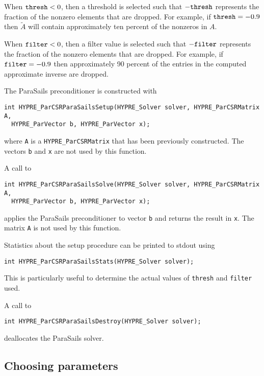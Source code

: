 When ${\tt thresh} < 0$, then a threshold is selected such that 
$-{\tt thresh}$ represents the fraction of the nonzero elements
that are dropped.  For example, if ${\tt thresh} = -0.9$ then
$\tilde{A}$ will contain approximately ten percent of the nonzeros
in $A$.

When ${\tt filter} < 0$, then a filter value is selected such that 
$-{\tt filter}$ represents the fraction of the nonzero elements
that are dropped.  For example, if ${\tt filter} = -0.9$ then
approximately 90 percent of the entries in the computed approximate 
inverse are dropped.

The ParaSails preconditioner is constructed with
\begin{display}
\begin{verbatim}
int HYPRE_ParCSRParaSailsSetup(HYPRE_Solver solver, HYPRE_ParCSRMatrix A,
  HYPRE_ParVector b, HYPRE_ParVector x);
\end{verbatim}
\end{display}
where {\tt A} is a {\tt HYPRE\_ParCSRMatrix} that has been 
previously constructed.  The vectors {\tt b} and {\tt x} are
not used by this function.

A call to
\begin{display}
\begin{verbatim}
int HYPRE_ParCSRParaSailsSolve(HYPRE_Solver solver, HYPRE_ParCSRMatrix A,
  HYPRE_ParVector b, HYPRE_ParVector x);
\end{verbatim}
\end{display}
applies the ParaSails preconditioner to vector {\tt b}
and returns the result in {\tt x}.  The matrix {\tt A}
is not used by this function.

Statistics about the setup procedure can be printed to stdout using
\begin{display}
\begin{verbatim}
int HYPRE_ParCSRParaSailsStats(HYPRE_Solver solver);
\end{verbatim}
\end{display}
This is particularly useful to determine the actual values of 
{\tt thresh} and {\tt filter} used.

A call to
\begin{display}
\begin{verbatim}
int HYPRE_ParCSRParaSailsDestroy(HYPRE_Solver solver);
\end{verbatim}
\end{display}
deallocates the ParaSails solver.

\subsection{Choosing parameters}

